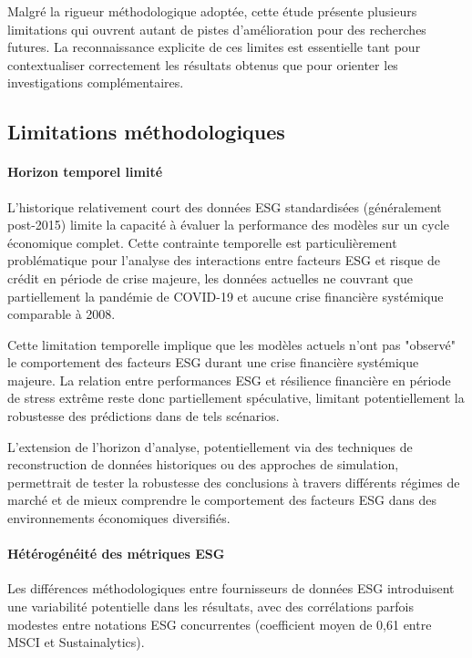 Malgré la rigueur méthodologique adoptée, cette étude présente plusieurs limitations qui ouvrent autant de pistes d'amélioration pour des recherches futures. La reconnaissance explicite de ces limites est essentielle tant pour contextualiser correctement les résultats obtenus que pour orienter les investigations complémentaires.

\subsection*{Limitations méthodologiques}

\paragraph{Horizon temporel limité} 
L'historique relativement court des données ESG standardisées (généralement post-2015) limite la capacité à évaluer la performance des modèles sur un cycle économique complet. Cette contrainte temporelle est particulièrement problématique pour l'analyse des interactions entre facteurs ESG et risque de crédit en période de crise majeure, les données actuelles ne couvrant que partiellement la pandémie de COVID-19 et aucune crise financière systémique comparable à 2008.

Cette limitation temporelle implique que les modèles actuels n'ont pas "observé" le comportement des facteurs ESG durant une crise financière systémique majeure. La relation entre performances ESG et résilience financière en période de stress extrême reste donc partiellement spéculative, limitant potentiellement la robustesse des prédictions dans de tels scénarios.

L'extension de l'horizon d'analyse, potentiellement via des techniques de reconstruction de données historiques ou des approches de simulation, permettrait de tester la robustesse des conclusions à travers différents régimes de marché et de mieux comprendre le comportement des facteurs ESG dans des environnements économiques diversifiés.

\paragraph{Hétérogénéité des métriques ESG} 
Les différences méthodologiques entre fournisseurs de données ESG introduisent une variabilité potentielle dans les résultats, avec des corrélations parfois modestes entre notations ESG concurrentes (coefficient moyen de 0,61 entre MSCI et Sustainalytics).

